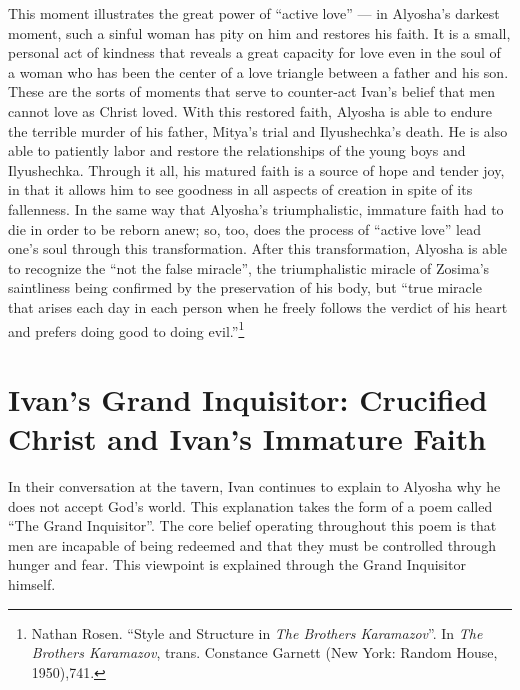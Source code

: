 This moment illustrates the great power of ``active love'' --- in Alyosha's darkest moment, such a sinful woman has pity on him and restores his faith. It is a small, personal act of kindness that reveals a great capacity for love even in the soul of a woman who has been the center of a love triangle between a father and his son. These are the sorts of moments that serve to counter-act Ivan's belief that men cannot love as Christ loved. With this restored faith, Alyosha is able to endure the terrible murder of his father, Mitya's trial and Ilyushechka's death. He is also able to patiently labor and restore the relationships of the young boys and Ilyushechka. Through it all, his matured faith is a source of hope and tender joy, in that it allows him to see goodness in all aspects of creation in spite of its fallenness. In the same way that Alyosha's triumphalistic, immature faith had to die in order to be reborn anew; so, too, does the process of ``active love'' lead one's soul through this transformation. After this transformation, Alyosha is able to recognize the ``not the false miracle'', the triumphalistic miracle of Zosima's saintliness being confirmed by the preservation of his body, but ``true miracle that arises each day in each person when he freely follows the verdict of his heart and prefers doing good to doing evil.''\footnote{Nathan Rosen. ``Style and Structure in \emph{The Brothers Karamazov}''. In \emph{The Brothers Karamazov}, trans. Constance Garnett (New York: Random House, 1950),741.}

\section{Ivan's Grand Inquisitor: Crucified Christ and Ivan's Immature Faith}
In their conversation at the tavern, Ivan continues to explain to Alyosha why he does not accept God's world. This explanation takes the form of a poem called ``The Grand Inquisitor''. The core belief operating throughout this poem is that men are incapable of being redeemed and that they must be controlled through hunger and fear. This viewpoint is explained through the Grand Inquisitor himself.

